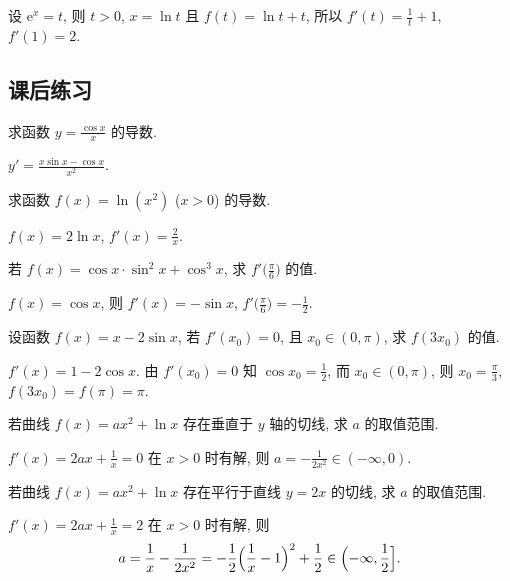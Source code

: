   \beginsolution
    设 $\mathrm{e}^x=t$, 则 $t>0$, $x=\ln t$ 且 $f(t)=\ln t+t$, 所以 $f'(t)=\frac1t+1$, $f'(1)=2$.
  \endsolution
  
  \subsection{课后练习}
  
  \begin{exercise}
    求函数 $y=\frac{\cos x}x$ 的导数.
  \end{exercise}

  \beginsolution
    $y'=\frac{x\sin x-\cos x}{x^2}$.
  \endsolution
  
  \begin{exercise}
    求函数 $f(x)=\ln(x^2)$ ($x>0$) 的导数.
  \end{exercise}

  \beginsolution
    $f(x)=2\ln x$, $f'(x)=\frac2x$.
  \endsolution
  
  \begin{exercise}
    若 $f(x)=\cos x\cdot\sin^2 x+\cos^3 x$, 
    求 $f'\Big(\frac{\pi}6\Big)$ 的值.
  \end{exercise}

  \beginsolution
    $f(x)=\cos x$, 则 $f'(x)=-\sin x$, 
    $f'\Big(\frac\pi6\Big)=-\frac12$.
  \endsolution
  
  \begin{exercise}
    设函数 $f(x)=x-2\sin x$, 若 $f'(x_0)=0$, 且 $x_0\in(0,\pi)$, 
    求 $f(3x_0)$ 的值.
  \end{exercise}

  \beginsolution
    $f'(x)=1-2\cos x$. 由 $f'(x_0)=0$ 知 $\cos x_0=\frac12$, 而  $x_0\in(0,\pi)$, 则 $x_0=\frac\pi3$, $f(3x_0)=f(\pi)=\pi$.
  \endsolution
  
  \begin{exercise}
    若曲线 $f(x)=ax^2 +\ln x$ 存在垂直于 $y$ 轴的切线, 求 $a$ 的取值范围.
  \end{exercise}

  \beginsolution
    $f'(x)=2ax+\frac1x=0$ 在 $x>0$ 时有解, 则 $a=-\frac1{2x^2}\in(-\infty,0)$.
    
    \varexercise 若曲线 $f(x)=ax^2+\ln x$ 存在平行于直线 $y=2x$ 的切线, 求 $a$ 的取值范围.
    
    $f'(x)=2ax+\frac1x=2$ 在 $x>0$ 时有解, 则 
    \[a=\frac1x-\frac1{2x^2}= -\frac12\Big(\frac1x-1\Big)^2+\frac12 \in\Bigl(-\infty,\frac12\Bigr].\]
  \endsolution
  
